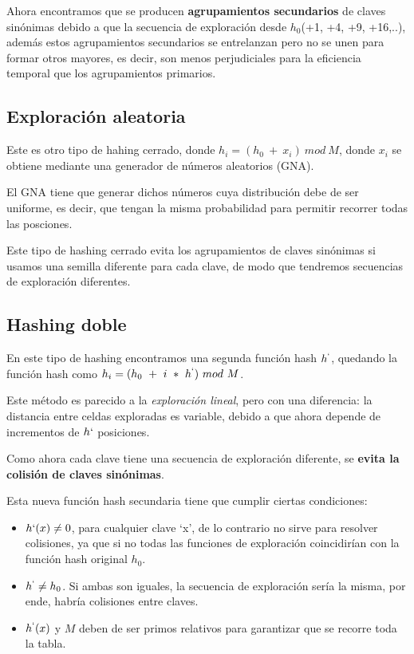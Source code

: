 Ahora encontramos que se producen \textbf{agrupamientos secundarios} de claves sinónimas debido a que la secuencia de exploración desde \(h_0 \)(+1, +4, +9, +16,..), además estos agrupamientos secundarios se entrelanzan pero no se unen para formar otros mayores, es decir, son menos perjudiciales para la eficiencia temporal que los agrupamientos primarios.

\subsection*{Exploración aleatoria}
Este es otro tipo de hahing cerrado, donde \(h_i = (h_0\ +\ x_i)\ mod\ M\), donde \(x_i\) se obtiene mediante una generador de números aleatorios (GNA).

El GNA tiene que generar dichos números cuya distribución debe de ser uniforme, es decir, que tengan la misma probabilidad para permitir recorrer todas las posciones.

Este tipo de hashing cerrado evita los agrupamientos de claves sinónimas si usamos una semilla diferente para cada clave, de modo que tendremos secuencias de exploración diferentes.

\subsection*{Hashing doble}
En este tipo de hashing encontramos una segunda función hash \(h^`\), quedando la función hash como \(h_i = (h_0\ +\ i\ *\ h^`)\ mod\ M\).

Este método es parecido a la \textit{exploración lineal}, pero con una diferencia: la distancia entre celdas exploradas es variable, debido a que ahora depende de incrementos de \(h`\) posiciones.

Como ahora cada clave tiene una secuencia de exploración diferente, se \textbf{evita la colisión de claves sinónimas}.

Esta nueva función hash secundaria tiene que cumplir ciertas condiciones:
\begin{itemize}
  \item \(h`(x) \neq 0\), para cualquier clave `x', de lo contrario no sirve para resolver colisiones, ya que si no todas las funciones de exploración coincidirían con la función hash original \(h_0\).
  \item \(h^` \neq h_0\). Si ambas son iguales, la secuencia de exploración sería la misma, por ende, habría colisiones entre claves.
  \item \(h^`(x)\) y \(M\) deben de ser primos relativos para garantizar que se recorre toda la tabla.
\end{itemize}

